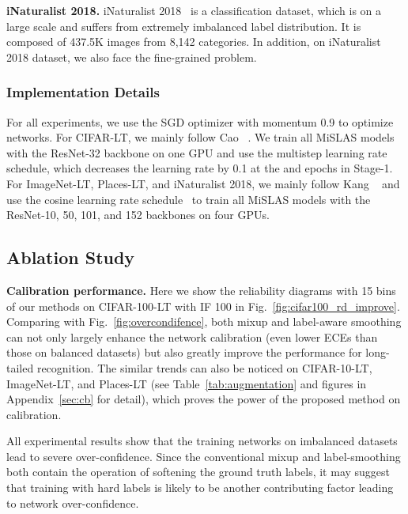 \documentclass[final]{cvpr}
\begin{document}
	\vspace{5pt}
	
	\noindent\textbf{iNaturalist 2018.} \quad iNaturalist 2018~\cite{van2018inaturalist} is a classification dataset, which is on a large scale and suffers from extremely imbalanced label distribution. It is composed of 437.5K images from 8,142 categories. In addition, on iNaturalist 2018 dataset, we also face the fine-grained problem.
	
	
\vspace{-2pt}
	\subsubsection{Implementation Details} 
	
	For all experiments, we use the SGD optimizer with momentum 0.9 to optimize networks. For CIFAR-LT, we mainly follow Cao \etal~\cite{ldam}. We train all MiSLAS models with the ResNet-32 backbone on one GPU and use the multistep learning rate schedule, which decreases the learning rate by 0.1 at the  and  epochs in Stage-1. For ImageNet-LT, Places-LT, and iNaturalist 2018, we mainly follow Kang \etal~\cite{decouple} and use the cosine learning rate schedule~\cite{loshchilov2016sgdr} to train all MiSLAS models with the ResNet-10, 50, 101, and 152 backbones on four GPUs.
	




	
	
	\subsection{Ablation Study}\label{sec:as}
	
	\vspace{1pt}
	
	\noindent\textbf{Calibration performance.} \quad Here we show the reliability diagrams with 15 bins of our methods on CIFAR-100-LT with IF 100 in Fig.~\ref{fig:cifar100_rd_improve}. Comparing with Fig.~\ref{fig:overcondifence}, both mixup and label-aware smoothing can not only largely enhance the network calibration (even lower ECEs than those on balanced datasets) but also greatly improve the performance for long-tailed recognition. The similar trends can also be noticed on CIFAR-10-LT, ImageNet-LT, and Places-LT (see Table~\ref{tab:augmentation} and figures in Appendix~\ref{sec:cb} for detail), which proves the power of the proposed method on calibration.
	
	All experimental results show that the training networks on imbalanced datasets lead to severe over-confidence. Since the conventional mixup and label-smoothing both contain the operation of softening the ground truth labels, it may suggest that training with hard labels is likely to be another contributing factor leading to network over-confidence.
	
\end{document}
